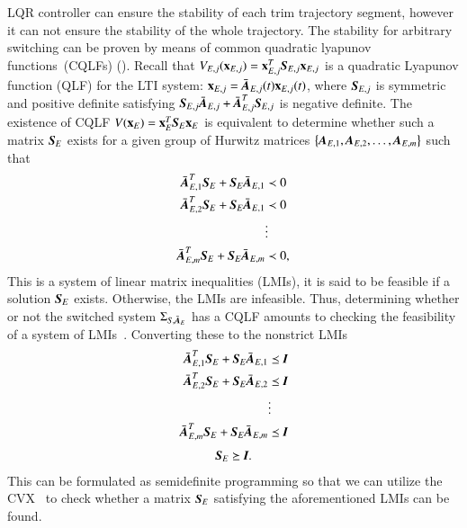 LQR controller can ensure the stability of each trim trajectory segment, however it can not ensure the stability of the whole trajectory. The stability for arbitrary switching can be proven by means of common quadratic lyapunov functions~(CQLFs) (\cite{Shorten2007}). Recall that $V_{E,j}(\vec{x}_{E,j})=\vec{x}_{E,j}^{T}\emph{\textbf{S}}_{E,j}\vec{x}_{E,j}$ is a quadratic Lyapunov function (QLF) for the LTI system: $\vec{x}_{E,j}=\bar{\emph{\textbf{A}}}_{E,j}(t)\vec{x}_{E,j}(t)$, where $\emph{\textbf{S}}_{E,j}$ is symmetric and positive definite satisfying $\emph{\textbf{S}}_{E,j}\bar{\emph{\textbf{A}}}_{E,j}
+\bar{\emph{\textbf{A}}}_{E,j}^{T}\emph{\textbf{S}}_{E,j}$ is negative definite. The existence of CQLF $V(\vec{x}_{E})=\vec{x}_{E}^{T}\emph{\textbf{S}}_{E}\vec{x}_{E}$ is equivalent to determine whether such a matrix $\emph{\textbf{S}}_{E}$ exists for a given group of Hurwitz matrices $\left\lbrace\emph{\textbf{A}}_{E,1}, \emph{\textbf{A}}_{E,2}, \ldots,\emph{\textbf{A}}_{E,m}\right\rbrace$ such that
\begin{align}
\bar{\emph{\textbf{A}}}_{E,1}^{T}\emph{\textbf{S}}_{E}
+\emph{\textbf{S}}_{E}\bar{\emph{\textbf{A}}}_{E,1} &\prec 0 \nonumber \\
\bar{\emph{\textbf{A}}}_{E,2}^{T}\emph{\textbf{S}}_{E}
+\emph{\textbf{S}}_{E}\bar{\emph{\textbf{A}}}_{E,1} &\prec 0 \nonumber \\
& \vdots \nonumber \\
\bar{\emph{\textbf{A}}}_{E,m}^{T}\emph{\textbf{S}}_{E}
+\emph{\textbf{S}}_{E}\bar{\emph{\textbf{A}}}_{E,m} & \prec 0,\label{EQ:LMI0}
\end{align} 
This is a system of linear matrix inequalities (LMIs), it is said to be feasible if a solution $\emph{\textbf{S}}_{E}$ exists. Otherwise, the LMIs are infeasible. 
Thus, determining whether or not the switched system $\Sigma_{S,\bar{\emph{\textbf{A}}}_{E}}$ has a CQLF amounts to checking the feasibility of a system of LMIs~\cite{Shorten2007}. 
Converting these to the nonstrict LMIs 
\begin{align}
\bar{\emph{\textbf{A}}}_{E,1}^{T}\emph{\textbf{S}}_{E}
+\emph{\textbf{S}}_{E}\bar{\emph{\textbf{A}}}_{E,1} &\preceq \emph{\textbf{I}} \nonumber \\
\bar{\emph{\textbf{A}}}_{E,2}^{T}\emph{\textbf{S}}_{E}
+\emph{\textbf{S}}_{E}\bar{\emph{\textbf{A}}}_{E,2} &\preceq 
\emph{\textbf{I}} \nonumber \\
& \vdots \nonumber \\
\bar{\emph{\textbf{A}}}_{E,m}^{T}\emph{\textbf{S}}_{E}
+\emph{\textbf{S}}_{E}\bar{\emph{\textbf{A}}}_{E,m} & \preceq \emph{\textbf{I}}
\label{EQ:LMI1}
\end{align} 
\begin{align}
\emph{\textbf{S}}_{E} \succeq \emph{\textbf{I}}. \label{EQ:LMI2}
\end{align}
This can be formulated as semidefinite programming so that we can utilize the CVX~\cite{cvx,gb08} to check whether a matrix $\emph{\textbf{S}}_{E}$ satisfying the aforementioned LMIs can be found. 

